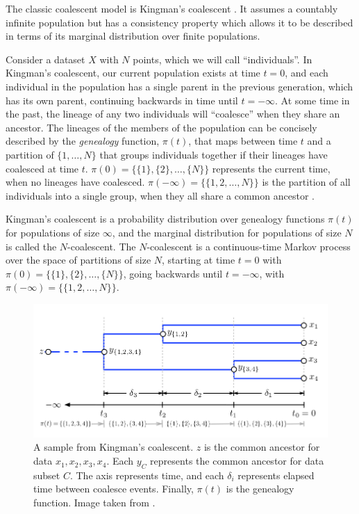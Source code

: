 \documentclass{article}
\begin{document}
The classic coalescent model is
Kingman's coalescent \citep{Kingman1982}.
It assumes a countably infinite population
but has a consistency property
which allows it to be described
in terms of its marginal distribution
over finite populations.

Consider a dataset $X$ with $N$ points, 
which we will call ``individuals''.
In Kingman's coalescent,
our current population exists at time $t = 0$,
and each individual in the population has a single
parent in the previous generation, which has its own parent,
continuing backwards in time until
$t = -\infty$. 
At some time in the past,
the lineage of any two individuals will ``coalesce''
when they share an ancestor.
The lineages of the members of the population
can be concisely described
by the
\emph{genealogy} function, $\pi(t)$,
that maps between time $t$
and a partition of $\{1, \ldots, N\}$
that groups individuals together
if their lineages have coalesced at time $t$.
$\pi(0) = \{\{1\}, \{2\},\ldots,\{N\}\}$
represents
the current time, when no
lineages have coalesced.
$\pi(-\infty) = \{\{1, 2, \ldots, N\}\}$
is the partition of all
individuals into a single group,
when they all share a common ancestor \citep{Teh2009}.

Kingman's coalescent
is a probability distribution
over genealogy functions $\pi(t)$
for populations of size $\infty$,
and the marginal distribution for
populations of size $N$ is called the $N$-coalescent.
The $N$-coalescent
is a continuous-time
Markov process
over the space of partitions
of size $N$,
starting at time $t = 0$ with
$\pi(0) = \{\{1\}, \{2\},\ldots,\{N\}\}$,
going backwards until  $t = -\infty$,
with
$\pi(-\infty) = \{\{1, 2, \ldots, N\}\}$.

\begin{figure}[H]
  \centering
  \includegraphics[width=\textwidth]{img/coalescent}
  \caption{A sample from Kingman's coalescent. $z$ is
  the common ancestor for data $x_1, x_2, x_3, x_4$. Each $y_C$
  represents the common ancestor for data subset $C$. 
  The axis represents time, and each $\delta_i$ represents elapsed time between
  coalesce events. Finally, $\pi(t)$ is
  the genealogy function. Image taken from \citep{Teh2009}.}
\label{fig:coalescent}
\end{figure}
\end{document}

